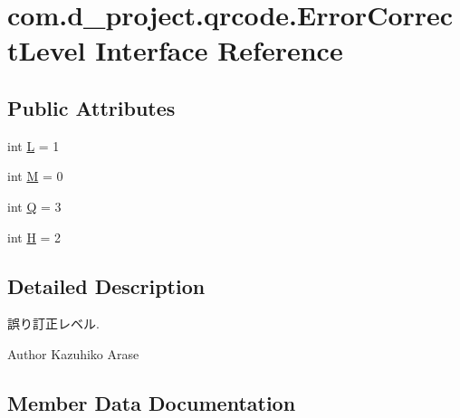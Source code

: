 \hypertarget{interfacecom_1_1d__project_1_1qrcode_1_1_error_correct_level}{}\section{com.\+d\+\_\+project.\+qrcode.\+Error\+Correct\+Level Interface Reference}
\label{interfacecom_1_1d__project_1_1qrcode_1_1_error_correct_level}
\subsection*{Public Attributes}
\begin{DoxyCompactItemize}
\item 
int \hyperlink{interfacecom_1_1d__project_1_1qrcode_1_1_error_correct_level_a1f95f26f4ed16703e45163b2f294af36}{L} = 1
\item 
int \hyperlink{interfacecom_1_1d__project_1_1qrcode_1_1_error_correct_level_ac5a8bba2c76a9cf6991a7c3c4e55b4dd}{M} = 0
\item 
int \hyperlink{interfacecom_1_1d__project_1_1qrcode_1_1_error_correct_level_a684e1a56d0864ac5578214ca1a255980}{Q} = 3
\item 
int \hyperlink{interfacecom_1_1d__project_1_1qrcode_1_1_error_correct_level_ac776705a24d2983b93a11391d5bf2c33}{H} = 2
\end{DoxyCompactItemize}


\subsection{Detailed Description}
誤り訂正レベル. \begin{DoxyAuthor}{Author}
Kazuhiko Arase 
\end{DoxyAuthor}


\subsection{Member Data Documentation}
\mbox{\label{interfacecom_1_1d__project_1_1qrcode_1_1_error_correct_level_ac776705a24d2983b93a11391d5bf2c33}} 

